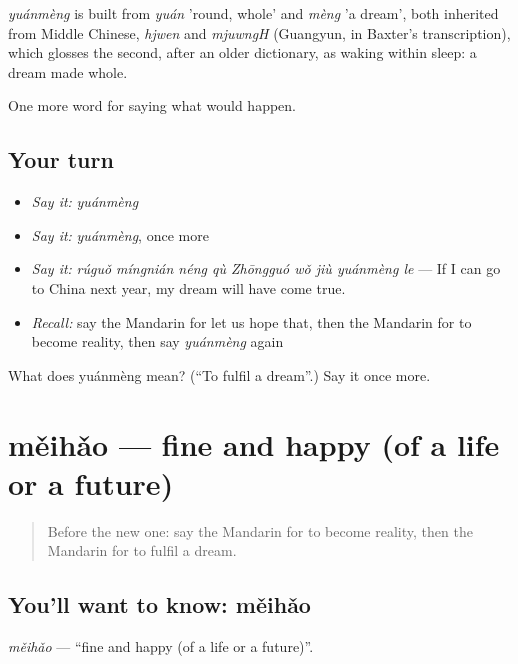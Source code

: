 \begin{cousinweb}
\emph{yuánmèng} is built from \emph{yuán} 'round, whole' and \emph{mèng} 'a dream', both inherited from Middle Chinese, \emph{hjwen} and \emph{mjuwngH} (Guangyun, in Baxter's transcription), which glosses the second, after an older dictionary, as waking within sleep: a dream made whole.
\end{cousinweb}

\begin{grammarlens}[title={What you've built}]
One more word for saying what would happen.
\end{grammarlens}

\subsection*{Your turn}
\begin{itemize}
\raggedright
  \item \emph{Say it:} \emph{yuánmèng}
  \item \emph{Say it:} \emph{yuánmèng}, once more
  \item \emph{Say it:} \emph{rúguǒ míngnián néng qù Zhōngguó wǒ jiù yuánmèng le} — If I can go to China next year, my dream will have come true.
  \item \emph{Recall:} say the Mandarin for let us hope that, then the Mandarin for to become reality, then say \emph{yuánmèng} again
\end{itemize}

\begin{tcolorbox}[breakable,colback=teal!4,colframe=teal!35!black,title={Before you move on}]
What does yuánmèng mean? (\textquotedblleft{}To fulfil a dream\textquotedblright{}.) Say it once more.
\end{tcolorbox}
\section[měihǎo]{měihǎo — fine and happy (of a life or a future)}

\label{lesson:ZH-C536-meihao}



\begin{quote}
Before the new one: say the Mandarin for to become reality, then the Mandarin for to fulfil a dream.
\end{quote}

\subsection*{You'll want to know: měihǎo}
\emph{měihǎo} — \textquotedblleft{}fine and happy (of a life or a future)\textquotedblright{}.

